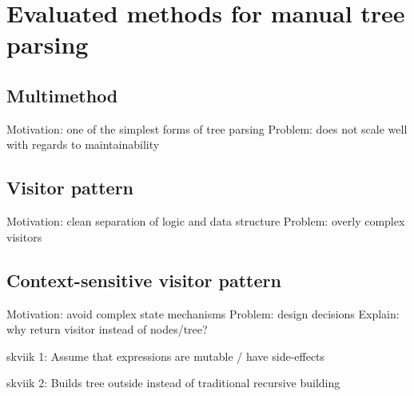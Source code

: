 \section{Evaluated methods for manual tree parsing}
\label{sect:method:evaluated_methods}

\subsection{Multimethod}
\label{sect:method:evaluated_methods}
Motivation: one of the simplest forms of tree parsing
Problem: does not scale well with regards to maintainability

\subsection{Visitor pattern}
\label{sect:method:evaluated_methods}
Motivation: clean separation of logic and data structure 
Problem: overly complex visitors

\subsection{Context-sensitive visitor pattern}
\label{sect:method:evaluated_methods}
Motivation: avoid complex state mechanisms
Problem: design decisions
Explain: why return visitor instead of nodes/tree?

skviik 1: Assume that expressions are mutable / have side-effects

skviik 2: Builds tree outside instead of traditional recursive building